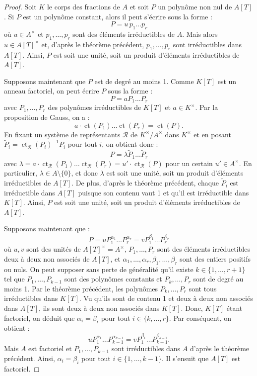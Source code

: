 \documentclass[]{report}
\begin{document}
\begin{proof}
    Soit $K$ le corps des fractions de $A$ et soit $P$ un polynôme non nul de $A[T]$. Si $P$ est un polynôme constant, alors il peut s'écrire sous la forme :
    \[P = u \, p_1 \dots p_r\]
    où $u \in A^{\times}$ et $p_1, \ldots, p_r$ sont des éléments irréductibles de $A$. Mais alors $u \in A[T]^{\times}$ et, d'après le théorème précédent, $p_1, \ldots, p_r$ sont irréductibles dans $A[T]$. Ainsi, $P$ est soit une unité, soit un produit d'éléments irréductibles de $A[T]$.

    Supposons maintenant que $P$ est de degré au moins 1. Comme $K[T]$ est un anneau factoriel, on peut écrire $P$ sous la forme :
    \[P = aP_1 \dots P_r\]
    avec $P_1, \dots, P_r$ des polynômes irréductibles de $K[T]$ et $a \in K^{\times}$. Par la proposition de Gauss, on a :
    \[a \cdot \operatorname{ct}(P_1) \dots \operatorname{ct}(P_r) = \operatorname{ct}(P).\]
    En fixant un système de représentants $\mathcal{R}$ de $K^{\times}/A^{\times}$ dans $K^{\times}$ et en posant $\tilde{P}_i = \operatorname{ct}_{\mathcal{R}}(P_i)^{-1} P_i$ pour tout $i$, on obtient donc :
    \[P = \lambda \tilde{P}_1 \dots \tilde{P}_r\]
    avec $\lambda = a \cdot \operatorname{ct}_{\mathcal{R}}(P_1) \dots \operatorname{ct}_{\mathcal{R}}(P_r) = u' \cdot \operatorname{ct}_{\mathcal{R}}(P)$ pour un certain $u' \in A^{\times}$. En particulier, $\lambda \in A \setminus \{0\}$, et donc $\lambda$ est soit une unité, soit un produit d'éléments irréductibles de $A[T]$. De plus, d'après le théorème précédent, chaque $\tilde{P}_i$ est irréductible dans $A[T]$ puisque son contenu vaut 1 et qu'il est irréductible dans $K[T]$. Ainsi, $P$ est soit une unité, soit un produit d'éléments irréductibles de $A[T]$.

    Supposons maintenant que :
    \[P = u P_1^{\alpha_1} \dots P_r^{\alpha_r} = v P_1^{\beta_1} \dots P_r^{\beta_r}\]
    où $u, v$ sont des unités de $A[T]^{\times} = A^{\times}$, $P_1, \dots, P_r$ sont des éléments irréductibles deux à deux non associés de $A[T]$, et $\alpha_1, \dots, \alpha_r, \beta_1, \dots, \beta_r$ sont des entiers positifs ou nuls. On peut supposer sans perte de généralité qu'il existe $k \in \{1, \dots, r+1\}$ tel que $P_1, \dots, P_{k-1}$ sont des polynômes constants et $P_k, \dots, P_r$ sont de degré au moins 1. Par le théorème précédent, les polynômes $P_k, \dots, P_r$ sont tous irréductibles dans $K[T]$. Vu qu'ils sont de contenu 1 et deux à deux non associés dans $A[T]$, ils sont deux à deux non associés dans $K[T]$. Donc, $K[T]$ étant factoriel, on déduit que $\alpha_i = \beta_i$ pour tout $i \in \{k, \dots, r\}$. Par conséquent, on obtient :
    \[u P_1^{\alpha_1} \dots P_{k-1}^{\alpha_{k-1}} = v P_1^{\beta_1} \dots P_{k-1}^{\beta_{k-1}}.\]
    Mais $A$ est factoriel et $P_1, \dots, P_{k-1}$ sont irréductibles dans $A$ d'après le théorème précédent. Ainsi, $\alpha_i = \beta_i$ pour tout $i \in \{1, \dots, k-1\}$. Il s'ensuit que $A[T]$ est factoriel.
\end{proof}
\end{document}

